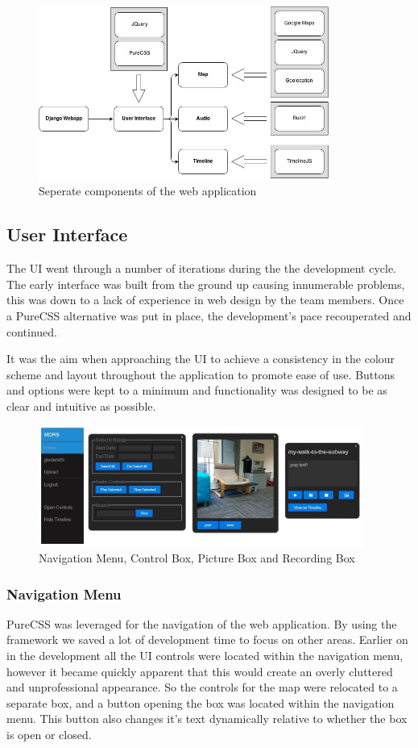 \documentclass{l3proj}
\begin{document}
\begin{figure}[ht!]
\centering
\includegraphics[width=0.85\textwidth]{images/webapp-imp.jpg}
\caption{Seperate components of the web application}
\end{figure}

\subsection{User Interface}		The UI went through a number of iterations during the the development cycle. The early interface was built from the ground up causing innumerable problems, this was down to a lack of experience in web design by the team members. Once a PureCSS alternative was put in place, the development's pace recouperated and continued.

It was the aim when approaching the UI to achieve a consistency in the colour scheme and layout throughout the application to promote ease of use. Buttons and options were kept to a minimum and functionality was designed to be as clear and intuitive as possible.

\begin{figure}[ht!]
\centering
\includegraphics[width=0.95\textwidth]{images/ui-elements.jpg}
\caption{Navigation Menu, Control Box, Picture Box and Recording Box}
\end{figure}

\subsubsection{Navigation Menu}		PureCSS was leveraged for the navigation of the web application. By using the framework we saved a lot of development time to focus on other areas. Earlier on in the development all the UI controls were located within the navigation menu, however it became quickly apparent that this would create an overly cluttered and unprofessional appearance. So the controls for the map were relocated to a separate box, and a button opening the box was located within the navigation menu. This button also changes it's text dynamically relative to whether the box is open or closed.
\end{document}
